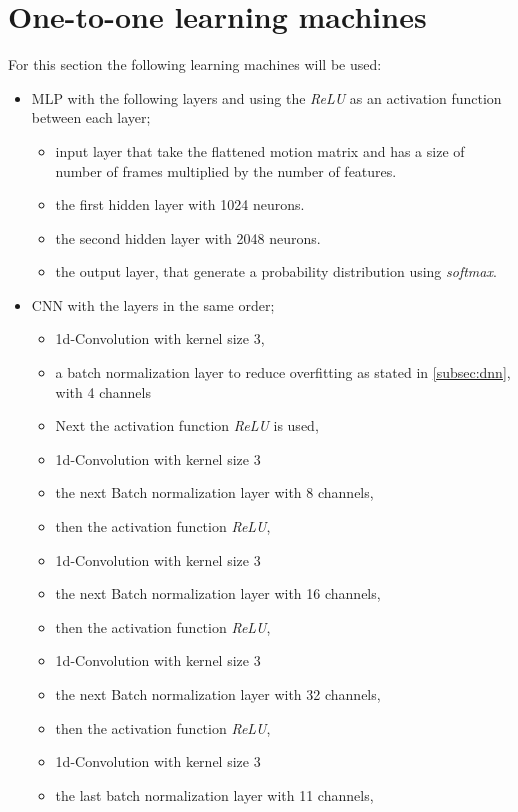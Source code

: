 	\section{One-to-one learning machines}\label{subsec:eva_one2one} 
		For this section the following learning machines will be used:
		\begin{itemize}
			\item MLP with the following layers and using the \textit{ReLU} as an activation function between each layer;
				\begin{itemize}
					\item input layer that take the flattened motion matrix and has a size of number of frames multiplied by the number of features.
					\item the first hidden layer with 1024 neurons.
					\item the second hidden layer with 2048 neurons.
					\item the output layer, that generate a probability distribution using \textit{softmax}.
				\end{itemize}
			\item CNN with the layers in the same order;
				\begin{itemize}
					\item 1d-Convolution with kernel size 3,
					\item a batch normalization layer to reduce overfitting as stated in \ref{subsec:dnn}, with 4 channels
					\item Next the activation function \textit{ReLU} is used,
					\item 1d-Convolution with kernel size 3
					\item the next Batch normalization layer with 8 channels,
					\item then the activation function \textit{ReLU},
					\item 1d-Convolution with kernel size 3
					\item the next Batch normalization layer with 16 channels,
					\item then the activation function \textit{ReLU},
					\item 1d-Convolution with kernel size 3
					\item the next Batch normalization layer with 32 channels,
					\item then the activation function \textit{ReLU},
					\item 1d-Convolution with kernel size 3
					\item the last batch normalization layer with 11 channels,

\end{itemize}
\end{itemize}
